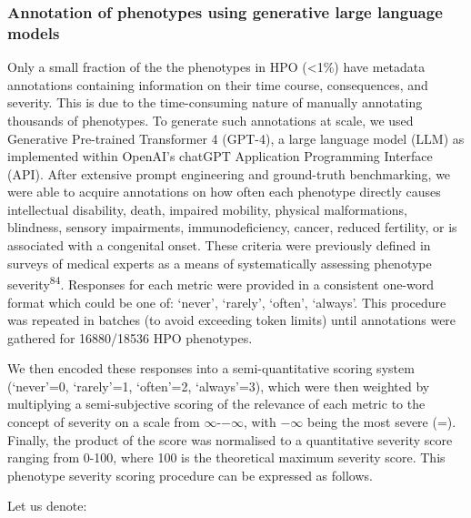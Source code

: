 \documentclass[
]{agujournal2019}
\begin{document}
\subsubsection{Annotation of phenotypes using generative large language
models}\label{annotation-of-phenotypes-using-generative-large-language-models-1}

Only a small fraction of the the phenotypes in HPO (\textless1\%) have
metadata annotations containing information on their time course,
consequences, and severity. This is due to the time-consuming nature of
manually annotating thousands of phenotypes. To generate such
annotations at scale, we used Generative Pre-trained Transformer 4
(GPT-4), a large language model (LLM) as implemented within OpenAI's
chatGPT Application Programming Interface (API). After extensive prompt
engineering and ground-truth benchmarking, we were able to acquire
annotations on how often each phenotype directly causes intellectual
disability, death, impaired mobility, physical malformations, blindness,
sensory impairments, immunodeficiency, cancer, reduced fertility, or is
associated with a congenital onset. These criteria were previously
defined in surveys of medical experts as a means of systematically
assessing phenotype severity\textsuperscript{84}. Responses for each
metric were provided in a consistent one-word format which could be one
of: `never', `rarely', `often', `always'. This procedure was repeated in
batches (to avoid exceeding token limits) until annotations were
gathered for 16880/18536 HPO phenotypes.

We then encoded these responses into a semi-quantitative scoring system
(`never'=0, `rarely'=1, `often'=2, `always'=3), which were then weighted
by multiplying a semi-subjective scoring of the relevance of each metric
to the concept of severity on a scale from
\ensuremath{\infty{}}-\ensuremath{-\infty{}}, with
\ensuremath{-\infty{}} being the most severe (=). Finally, the product
of the score was normalised to a quantitative severity score ranging
from 0-100, where 100 is the theoretical maximum severity score. This
phenotype severity scoring procedure can be expressed as follows.

Let us denote:
\end{document}
